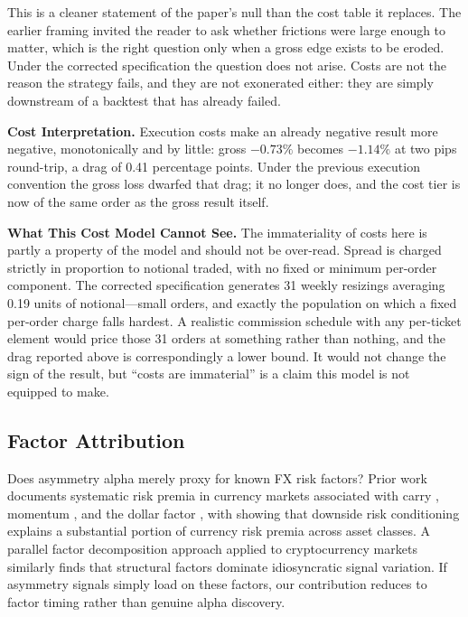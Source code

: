 \documentclass[11pt]{article}
\begin{document}
This is a cleaner statement of the paper's null than the cost table it replaces. The earlier framing invited the reader to ask whether frictions were large enough to matter, which is the right question only when a gross edge exists to be eroded. Under the corrected specification the question does not arise. Costs are not the reason the strategy fails, and they are not exonerated either: they are simply downstream of a backtest that has already failed.

\textbf{Cost Interpretation.} Execution costs make an already negative result more negative, monotonically and by little: gross $-0.73\%$ becomes $-1.14\%$ at two pips round-trip, a drag of 0.41 percentage points. Under the previous execution convention the gross loss dwarfed that drag; it no longer does, and the cost tier is now of the same order as the gross result itself.

\textbf{What This Cost Model Cannot See.} The immateriality of costs here is partly a property of the model and should not be over-read. Spread is charged strictly in proportion to notional traded, with no fixed or minimum per-order component. The corrected specification generates 31 weekly resizings averaging 0.19 units of notional---small orders, and exactly the population on which a fixed per-order charge falls hardest. A realistic commission schedule with any per-ticket element would price those 31 orders at something rather than nothing, and the drag reported above is correspondingly a lower bound. It would not change the sign of the result, but ``costs are immaterial'' is a claim this model is not equipped to make.

\subsection{Factor Attribution}
\label{sec:factors}

Does asymmetry alpha merely proxy for known FX risk factors? Prior work documents systematic risk premia in currency markets associated with carry \citep{lustig2011common}, momentum \citep{menkhoff2012currency}, and the dollar factor \citep{verdelhan2018dollar}, with \citet{lettau2014conditional} showing that downside risk conditioning explains a substantial portion of currency risk premia across asset classes. A parallel factor decomposition approach applied to cryptocurrency markets \citep{farzulla2025whitepaper} similarly finds that structural factors dominate idiosyncratic signal variation. If asymmetry signals simply load on these factors, our contribution reduces to factor timing rather than genuine alpha discovery.
\end{document}
